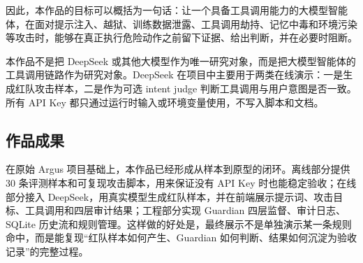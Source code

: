 \documentclass[UTF8,a4paper,zihao=-4]{ctexart}
\begin{document}
因此，本作品的目标可以概括为一句话：让一个具备工具调用能力的大模型智能体，在面对提示注入、越狱、训练数据泄露、工具调用劫持、记忆中毒和环境污染等攻击时，能够在真正执行危险动作之前留下证据、给出判断，并在必要时阻断。

本作品不是把 DeepSeek 或其他大模型作为唯一研究对象，而是把大模型智能体的工具调用链路作为研究对象。DeepSeek 在项目中主要用于两类在线演示：一是生成红队攻击样本，二是作为可选 intent judge 判断工具调用与用户意图是否一致。所有 API Key 都只通过运行时输入或环境变量使用，不写入脚本和文档。

\subsection{作品成果}

在原始 Argus 项目基础上，本作品已经形成从样本到原型的闭环。离线部分提供 30 条评测样本和可复现攻击脚本，用来保证没有 API Key 时也能稳定验收；在线部分接入 DeepSeek，用真实模型生成红队样本，并在前端展示提示词、攻击目标、工具调用和四层审计结果；工程部分实现 Guardian 四层监督、审计日志、SQLite 历史流和规则管理。这样做的好处是，最终展示不是单独演示某一条规则命中，而是能复现“红队样本如何产生、Guardian 如何判断、结果如何沉淀为验收记录”的完整过程。
\end{document}
